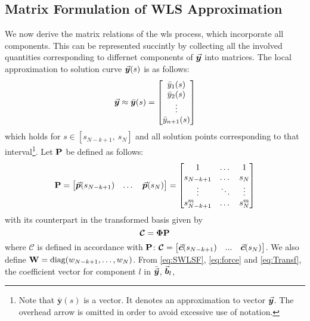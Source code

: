 \subsection{Matrix Formulation of WLS Approximation}\label{CH5-S2SS1}

We now
derive the matrix relations of the \acrshort{wls} process, which incorporate 
all 
components. This can be represented succintly by collecting all the involved 
quantities corresponding to differnet components of $\vec{\bm{y}}$ into matrices. 
The local approximation to solution curve $\vec{\bm{y}}(s)$ is as follows:
\begin{equation*}
	\vec{\bm{y}}\approx \bar{\bm{y}}(s)=\begin{bmatrix}
		\bar{y}_1(s)\\ \bar{y}_2(s)\\ \vdots \\ \bar{y}_{n+1}(s)
	\end{bmatrix}
\end{equation*}
which holds for $s\in[s_{N-k+1},\ s_N]$ and all solution points 
corresponding to that interval\footnote{Note that $\bar{\bm{y}}(s)$ is a 
vector. 
It denotes an approximation to vector $\vec{\bm{y}}$. The overhead arrow is omitted 
in order to avoid excessive use of notation.}. Let $\mathbf{P}$ be defined as 
follows:
\begin{equation}
	\mathbf{P}=\begin{bmatrix}
		\vec{\bm{p}}(s_{N-k+1}) & \dots & \vec{\bm{p}}(s_N)
	\end{bmatrix}=\begin{bmatrix}
		1 &  \dots & 1\\
		s_{N-k+1} & \dots & s_N\\
		\vdots & \ddots & \vdots\\
		s_{N-k+1}^m & \dots & s_N^m
	\end{bmatrix}
	\label{eq:P}
\end{equation}
with its counterpart  in the transformed basis given by
\begin{equation}
	\bm{\mathcal{C}}=\mathbf{\Phi}\mathbf{P}
	\label{eq:TransMat}
\end{equation}
where $\bm{\mathcal{C}}$ is defined in accordance with $\mathbf{P}$: 
$\bm{\mathcal{C}}= 
\begin{bmatrix}
	\vec{\bm{c}}(s_{N-k+1}) & ... & \vec{\bm{c}}(s_N)
\end{bmatrix}$. We also define $\mathbf{W}=\text{diag}(w_{N-k+1},\dots,w_N)$. From
\ref{eq:SWLSF}, \ref{eq:force} and \ref{eq:Transf}, the coefficient vector
for component $l$ in $\bar{\vec{\bm{y}}}$, $\vec{\bm{b}}_l$, 
